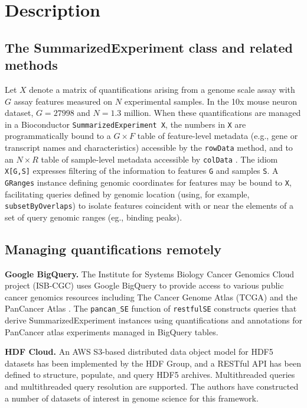\documentclass[applications]{gen-bioinformatics}
\begin{document}
\section*{Description}

\subsection*{The SummarizedExperiment class and related methods}

Let $X$ denote a matrix of quantifications arising from a genome
scale assay with $G$ assay features measured on $N$ experimental
samples.  In the 10x mouse neuron dataset, $G=27998$ and $N=1.3$ million.
When these quantifications are managed in a Bioconductor \verb+SummarizedExperiment X+, the numbers in \verb+X+ are programmatically bound to a $G \times F$
table of feature-level metadata (e.g., gene or transcript names and
characteristics) accessible by the \verb+rowData+ method, and to an $N \times R$ table of sample-level metadata accessible by \verb+colData+ \citep{Huber2015}. 
The idiom \verb+X[G,S]+ expresses filtering of 
the information
to features \verb+G+ and samples \verb+S+.  A \verb+GRanges+ 
instance \citep{Lawrence2013} defining genomic coordinates for features may be bound to \verb+X+,
facilitating queries defined by genomic location (using, for example, \verb+subsetByOverlaps+) to isolate features
coincident with or near the elements of a set of query genomic ranges (eg., binding peaks).

\subsection*{Managing quantifications remotely}

\noindent
\textbf{Google BigQuery.} The Institute for Systems Biology Cancer
Genomics Cloud project (ISB-CGC) \citep{ISBCGC} uses 
Google BigQuery to provide access to
various public cancer genomics resources including
The Cancer Genome Atlas (TCGA) and the PanCancer Atlas \citep{Hoadley2018}.
The \verb+pancan_SE+
function of \verb+restfulSE+ constructs queries that derive
SummarizedExperiment instances using quantifications and annotations
for PanCancer atlas experiments
managed in BigQuery tables.  

\noindent
\textbf{HDF Cloud.}  
An AWS S3-based distributed data object model for HDF5
datasets has been implemented by the HDF Group, and
a RESTful API has been defined to structure, populate,
and query HDF5 archives.  Multithreaded queries and
multithreaded query resolution are supported.
The authors have constructed a number of datasets of
interest in genome science for this framework.
\end{document}
